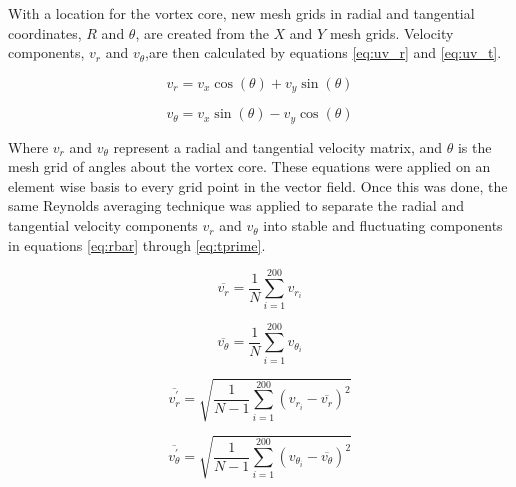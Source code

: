 With a location for the vortex core, new mesh grids in radial and tangential 
coordinates, $R$ and $\theta$, are created from the $X$ and 
$Y$ mesh grids. Velocity components, $v_r$ and $v_\theta$,are then 
calculated by equations \ref{eq:uv_r} and \ref{eq:uv_t}.

\begin{equation}
v_{r} = v_{x} \cos{(\theta)} + v_{y} \sin{(\theta)}
\label{eq:uv_r}
\end{equation}

\begin{equation}
v_{\theta} = v_{x} \sin{(\theta)} - v_{y} \cos{(\theta)}
\label{eq:uv_t}
\end{equation}

Where $v_{r}$ and $v_{\theta}$ represent a radial and tangential velocity 
matrix, and $\theta$ is the mesh grid of angles 
about the vortex core. These equations were applied on an element wise basis to 
every grid point in the vector field. Once this was done, the same Reynolds 
averaging technique was applied to separate the radial and tangential velocity 
components $v_{r}$ and $v_{\theta}$ into stable and fluctuating components in 
equations 
\ref{eq:rbar} through \ref{eq:tprime}.

\begin{equation}
\overline{v_r}  = \frac{1}{N} \sum_{i=1}^{200} v_{r_i}
\label{eq:rbar}
\end{equation}

\begin{equation}
\overline{v_\theta}  = \frac{1}{N} \sum_{i=1}^{200} v_{\theta_i}
\label{eq:tbar}
\end{equation}

\begin{equation}
\overline{v_r^\prime} = \sqrt{\frac{1}{N-1} \sum_{i=1}^{200} (v_{r_i} - 
\overline{v_r})^2}
\label{eq:rprime}
\end{equation}

\begin{equation}
\overline{v_\theta^\prime} = \sqrt{\frac{1}{N-1} \sum_{i=1}^{200} (v_{\theta_i} 
- 
\overline{v_\theta})^2}
\label{eq:tprime}
\end{equation}

